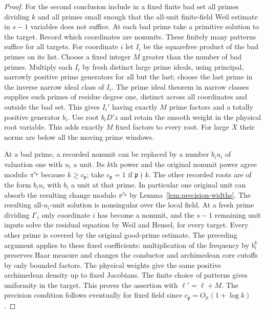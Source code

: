 \documentclass[11pt,letterpaper]{article}
\theoremstyle{definition}
\numberwithin{equation}{section}
\begin{document}
\begin{proof}
For the second conclusion include in a fixed finite bad set all
primes dividing $k$ and all primes small enough that the all-unit
finite-field Weil estimate in $s-1$ variables does not suffice.
At each bad prime take a primitive solution to the target. Record
which coordinates are nonunits. These finitely many patterns
suffice for all targets. For coordinate $i$ let $I_i$ be the
squarefree product of the bad primes on its list. Choose a fixed
integer $M$ greater than the number of bad primes. Multiply each
$I_i$ by fresh distinct large prime ideals, using principal,
narrowly positive prime generators for all but the last; choose
the last prime in the inverse narrow ideal class of $I_i$.
The prime ideal theorem in narrow classes supplies such primes
of residue degree one, distinct across all coordinates and outside
the bad set. This gives $I_i'$ having exactly $M$ prime factors
and a totally positive generator $b_i$. Use root $b_iD'z$
and retain the smooth weight in the physical root variable. This
adds exactly $M$ fixed factors to every root. For large $X$ their
norms are below all the moving prime windows.

At a bad prime, a recorded nonunit can be replaced by a number
$b_i u_i$ of valuation one with $u_i$ a unit. Its $k$th power
and the original nonunit power agree modulo $\pi^{c_{\mathfrak p}}$
because $k\ge c_{\mathfrak p}$; take $c_{\mathfrak p}=1$ if
$\mathfrak p\nmid k$. The other recorded roots are of the form
$b_i u_i$ with $b_i$ a unit at that prime. In particular one
original unit can absorb the resulting change modulo
$\pi^{c_{\mathfrak p}}$ by Lemma~\ref{lem:precision-widths}. The
resulting all-$u_i$-unit solution is nonsingular over the local
field. At a fresh prime dividing $I'_i$ only coordinate $i$
has become a nonunit, and the $s-1$ remaining unit inputs solve
the residual equation by Weil and Hensel, for every target.
Every other prime is covered by the original good-prime estimate.
The preceding argument applies to these fixed coefficients:
multiplication of the frequency by $b_i^k$ preserves Haar measure
and changes the conductor and archimedean core cutoffs by only
bounded factors. The physical weights give the same positive
archimedean density up to fixed Jacobians. The finite choice of
patterns gives uniformity in the target. This proves the assertion
with $\ell'=\ell+M$. The precision condition follows eventually
for fixed field since $c_{\mathfrak p}=O_{\mathbb K}(1+\log k)$.
\end{proof}
\end{document}
